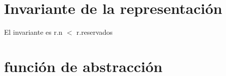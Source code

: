 \hypertarget{rep_conjunto_invConjunto}{}\section{Invariante de la representación}\label{rep_conjunto_invConjunto}
El invariante es r.\+n $<$ r.\+reservados\hypertarget{rep_conjunto_faConjunto}{}\section{función de abstracción}\label{rep_conjunto_faConjunto}
